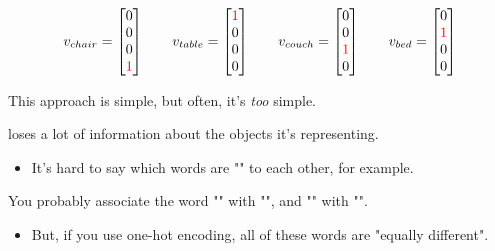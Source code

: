         
        \begin{equation}
            v_{chair} = 
            \begin{bmatrix}
              0\\0\\0\\ \textcolor{red}{1}
            \end{bmatrix}
            \qquad
            v_{table} = 
            \begin{bmatrix}
              \textcolor{red}{1}\\0\\0\\0
            \end{bmatrix}
            \qquad
            v_{couch} = 
            \begin{bmatrix}
              0\\0\\\textcolor{red}{1}\\0
            \end{bmatrix}
            \qquad
            v_{bed} = 
            \begin{bmatrix}
              0\\\textcolor{red}{1}\\0\\0
            \end{bmatrix}
        \end{equation}

        This approach is simple, but often, it's \textit{too} simple.\\

        \begin{concept}
             loses a lot of information about the objects it's representing.

            \begin{itemize}
                \item It's hard to say which words are "" to each other, for example.
            \end{itemize}
        \end{concept}

        \miniex You probably associate the word "" with "", and "" with "".

        \begin{itemize}
            \item But, if you use one-hot encoding, all of these words are "equally different".
        \end{itemize}

